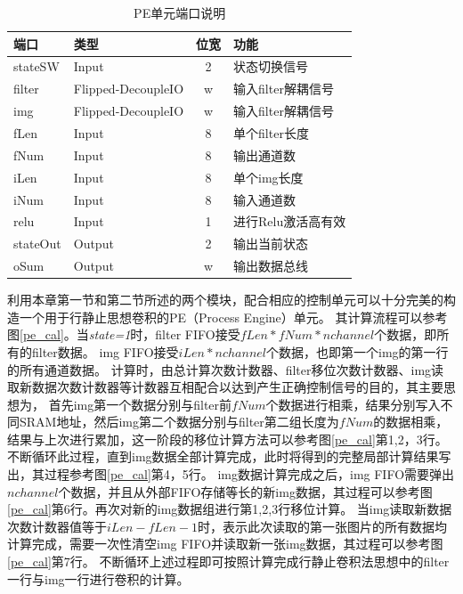 \begin{table}[h] %
    \centering
    \caption{PE单元端口说明} %
    \begin{tabular}{l|l|c|l} %
    \hline  
    \hline  
    端口 & 类型 & 位宽 & 功能 \\ %
    \hline %
    stateSW & Input & 2 & 状态切换信号 \\
    \hline  
    filter & Flipped-DecoupleIO & w & 输入filter解耦信号 \\
    \hline  
    img & Flipped-DecoupleIO & w & 输入filter解耦信号 \\
    \hline  
    fLen & Input & 8 & 单个filter长度 \\
    \hline  
    fNum & Input & 8 & 输出通道数 \\
    \hline  
    iLen & Input & 8 & 单个img长度 \\
    \hline  
    iNum & Input & 8 & 输入通道数 \\
    \hline  
    relu & Input & 1 & 进行Relu激活高有效 \\
    \hline  
    stateOut & Output & 2 & 输出当前状态 \\
    \hline  
    oSum & Output & w & 输出数据总线 \\
    \hline  
    \hline  
    \end{tabular}  
\end{table}  
利用本章第一节和第二节所述的两个模块，配合相应的控制单元可以十分完美的构造一个用于行静止思想卷积的PE（Process Engine）单元。
其计算流程可以参考图\ref{pe_cal}。当\emph{state=1}时，filter FIFO接受$fLen*fNum*nchannel$个数据，即所有的filter数据。
img FIFO接受$iLen*nchannel$个数据，也即第一个img的第一行的所有通道数据。
计算时，由总计算次数计数器、filter移位次数计数器、img读取新数据次数计数器等计数器互相配合以达到产生正确控制信号的目的，其主要思想为，
首先img第一个数据分别与filter前$fNum$个数据进行相乘，结果分别写入不同SRAM地址，然后img第二个数据分别与filter第二组长度为$fNum$的数据相乘，结果与上次进行累加，这一阶段的移位计算方法可以参考图\ref{pe_cal}第1,2，3行。
不断循环此过程，直到img数据全部计算完成，此时将得到的完整局部计算结果写出，其过程参考图\ref{pe_cal}第4，5行。
img数据计算完成之后，img FIFO需要弹出$nchannel$个数据，并且从外部FIFO存储等长的新img数据，其过程可以参考图\ref{pe_cal}第6行。再次对新的img数据组进行第1,2,3行移位计算。
当img读取新数据次数计数器值等于$iLen - fLen - 1$时，表示此次读取的第一张图片的所有数据均计算完成，需要一次性清空img FIFO并读取新一张img数据，其过程可以参考图\ref{pe_cal}第7行。
不断循环上述过程即可按照计算完成行静止卷积法思想中的filter一行与img一行进行卷积的计算。



